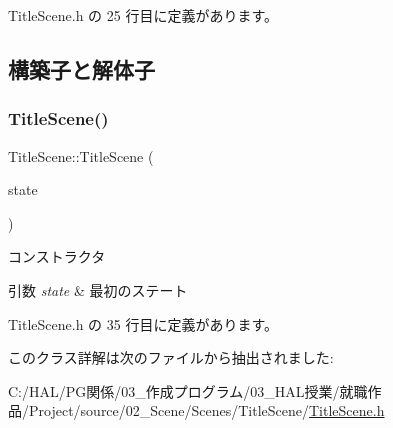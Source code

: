  Title\+Scene.\+h の 25 行目に定義があります。



\subsection{構築子と解体子}
\mbox{\label{class_title_scene_a433ef854689b1c9defb29d9f999c52da}} 
\subsubsection{\texorpdfstring{Title\+Scene()}{TitleScene()}}
{\footnotesize\ttfamily Title\+Scene\+::\+Title\+Scene (\begin{DoxyParamCaption}\item[{\mbox{\hyperlink{class_scene_base_1_1_state_base}{State\+Base}} $\ast$}]{state }\end{DoxyParamCaption})\hspace{0.3cm}{\ttfamily [inline]}}



コンストラクタ 


\begin{DoxyParams}{引数}
{\em state} & 最初のステート \\
\hline
\end{DoxyParams}


 Title\+Scene.\+h の 35 行目に定義があります。



このクラス詳解は次のファイルから抽出されました\+:\begin{DoxyCompactItemize}
\item 
C\+:/\+H\+A\+L/\+P\+G関係/03\+\_\+作成プログラム/03\+\_\+\+H\+A\+L授業/就職作品/\+Project/source/02\+\_\+\+Scene/\+Scenes/\+Title\+Scene/\mbox{\hyperlink{_title_scene_8h}{Title\+Scene.\+h}}\end{DoxyCompactItemize}
